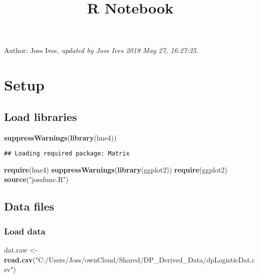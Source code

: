\documentclass[]{article}
\title{R Notebook}
\author{}
\date{}
\newenvironment{Shaded}{\begin{snugshade}}{\end{snugshade}}
\newcommand{\KeywordTok}[1]{\textcolor[rgb]{0.13,0.29,0.53}{\textbf{#1}}}
\newcommand{\StringTok}[1]{\textcolor[rgb]{0.31,0.60,0.02}{#1}}
\newcommand{\NormalTok}[1]{#1}
\begin{document}
\maketitle

Author: Joss Ives, \emph{updated by Joss Ives 2018 May 27, 16:27:25}.

\section{Setup}\label{setup}

\subsection{Load libraries}\label{load-libraries}

\begin{Shaded}
\begin{Highlighting}[]
\KeywordTok{suppressWarnings}\NormalTok{(}\KeywordTok{library}\NormalTok{(lme4))}
\end{Highlighting}
\end{Shaded}

\begin{verbatim}
## Loading required package: Matrix
\end{verbatim}

\begin{Shaded}
\begin{Highlighting}[]
\KeywordTok{require}\NormalTok{(lme4)}
\KeywordTok{suppressWarnings}\NormalTok{(}\KeywordTok{library}\NormalTok{(ggplot2))}
\KeywordTok{require}\NormalTok{(ggplot2)}
\KeywordTok{source}\NormalTok{(}\StringTok{"jossfunc.R"}\NormalTok{)}
\end{Highlighting}
\end{Shaded}

\subsection{Data files}\label{data-files}

\subsubsection{Load data}\label{load-data}

\begin{Shaded}
\begin{Highlighting}[]
\NormalTok{dat.raw <-}\StringTok{ }\KeywordTok{read.csv}\NormalTok{(}\StringTok{"C:/Users/Joss/ownCloud/Shared/DP_Derived_Data/dpLogisticDat.csv"}\NormalTok{)}
\end{Highlighting}
\end{Shaded}
\end{document}
